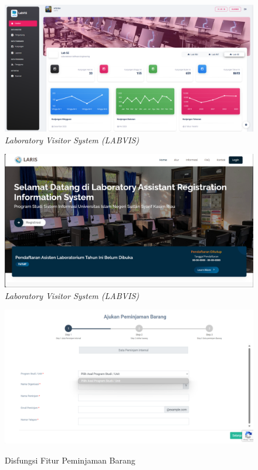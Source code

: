 \begin{figure}
	\centering
	\includegraphics[width=0.82\linewidth]{konten//gambar/labvis.png}
	\caption{\textit{Laboratory Visitor System (LABVIS)} \protect\cite{web-prodi}}
	\label{fig:enter-label}
\end{figure}

\begin{figure}
	\centering
	\includegraphics[width=0.82\linewidth]{konten//gambar/laris.png}
	\caption{\textit{Laboratory Visitor System (LABVIS)} \protect\cite{web-prodi}}
	\label{fig:enter-label}
\end{figure}

\begin{figure}
	\centering
	\includegraphics[width=0.82\linewidth]{konten//gambar/observasi-peminjaman-barang.png}
	\caption{Disfungsi Fitur Peminjaman Barang} \protect\cite{sitaris}
	\label{fig:enter-label}
\end{figure}

